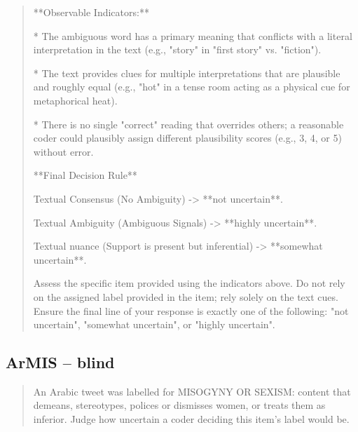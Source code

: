 \begin{quote}
**Observable Indicators:**

*   The ambiguous word has a primary meaning that conflicts with a literal interpretation in the text (e.g., "story" in "first story" vs. "fiction").

*   The text provides clues for multiple interpretations that are plausible and roughly equal (e.g., "hot" in a tense room acting as a physical cue for metaphorical heat).

*   There is no single "correct" reading that overrides others; a reasonable coder could plausibly assign different plausibility scores (e.g., 3, 4, or 5) without error.



**Final Decision Rule**

Textual Consensus (No Ambiguity) -> **not uncertain**.

Textual Ambiguity (Ambiguous Signals) -> **highly uncertain**.

Textual nuance (Support is present but inferential) -> **somewhat uncertain**.



Assess the specific item provided using the indicators above. Do not rely on the assigned label provided in the item; rely solely on the text cues. Ensure the final line of your response is exactly one of the following: "not uncertain", "somewhat uncertain", or "highly uncertain".
\end{quote}
\subsection*{ArMIS -- blind}
\begin{quote}\small
An Arabic tweet was labelled for MISOGYNY OR SEXISM: content that demeans, stereotypes, polices or dismisses women, or treats them as inferior. Judge how uncertain a coder deciding this item's label would be.
\end{quote}
